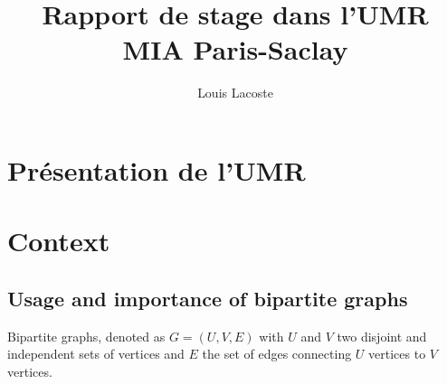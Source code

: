 \documentclass[12pt,a4paper]{report}
\title{Rapport de stage dans l'UMR MIA Paris-Saclay}
\author{Louis Lacoste}
\begin{document}
\maketitle
\tableofcontents

\chapter{Présentation de l'UMR}

\chapter{Context}

\section{Usage and importance of bipartite graphs}

Bipartite graphs, denoted as $G = (U,V,E)$ with $U$ and $V$ two disjoint and
independent sets of vertices and $E$ the set of edges connecting $U$ vertices to
$V$ vertices.
\end{document}

